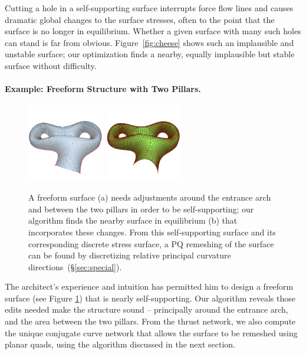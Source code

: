 \documentclass[annual]{acmsiggraph}
\newcommand{\secref}[1]{(\S\ref{#1})}
\begin{document}
Cutting a hole in a self-supporting surface interrupts force flow lines and causes dramatic global changes
to the surface stresses, often to the point that the surface is no longer in equilibrium. Whether a given surface
with many such holes can stand is far from obvious. Figure~\ref{fig:cheese} shows such an implausible and unstable 
surface; our optimization finds a nearby, equally implausible but stable surface without difficulty.

\paragraph{Example: Freeform Structure with Two Pillars.}

\begin{figure}[htb]
\centering
\includegraphics[width=0.3\textwidth]{fig/cas}
\includegraphics[width=0.3\textwidth]{fig/cas-n}
\hfill
\caption{A freeform surface (a) needs adjustments around the entrance arch and between the two pillars in order to be self-supporting;
our algorithm finds the nearby surface in equilibrium (b) that incorporates these changes. From this self-supporting surface and its
corresponding discrete stress surface, a PQ remeshing of the surface can be found by discretizing relative principal curvature
directions~\secref{sec:special}. }
 \label{fig:cas} 
 \end{figure}

The architect's experience and intuition has permitted him to design a freeform surface 
(see Figure \ref{fig:cas}) that is nearly self-supporting. Our algorithm reveals those
edits needed make the structure sound -- principally around the entrance arch, and the area
between the two pillars. From the thrust network, we also compute the unique conjugate curve
network that allows the surface to be remeshed using planar quads, using the algorithm
discussed in the next section.
\end{document}
